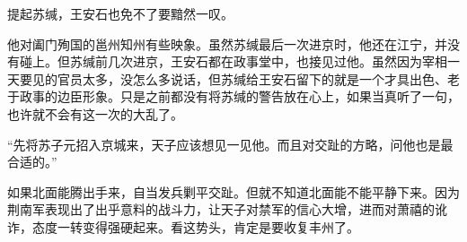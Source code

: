 提起苏缄，王安石也免不了要黯然一叹。

他对阖门殉国的邕州知州有些映象。虽然苏缄最后一次进京时，他还在江宁，并没有碰上。但苏缄前几次进京，王安石都在政事堂中，也接见过他。虽然因为宰相一天要见的官员太多，没怎么多说话，但苏缄给王安石留下的就是一个才具出色、老于政事的边臣形象。只是之前都没有将苏缄的警告放在心上，如果当真听了一句，也许就不会有这一次的大乱了。

“先将苏子元招入京城来，天子应该想见一见他。而且对交趾的方略，问他也是最合适的。”

如果北面能腾出手来，自当发兵剿平交趾。但就不知道北面能不能平静下来。因为荆南军表现出了出乎意料的战斗力，让天子对禁军的信心大增，进而对萧禧的讹诈，态度一转变得强硬起来。看这势头，肯定是要收复丰州了。

